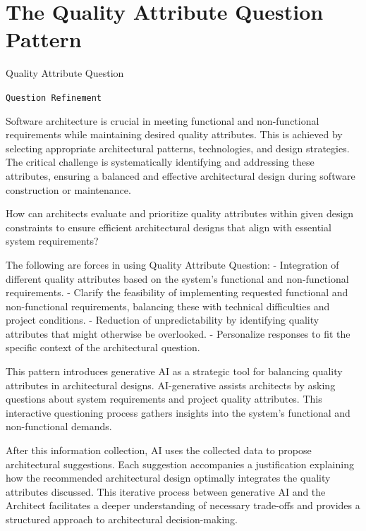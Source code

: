 \section{The Quality Attribute Question Pattern} \label{sec:quality-attribute-question}

 Quality Attribute Question

\texttt{Question Refinement}

 Software architecture is crucial in meeting functional and non-functional requirements while maintaining desired quality attributes. This is achieved by selecting appropriate architectural patterns, technologies, and design strategies. The critical challenge is systematically identifying and addressing these attributes, ensuring a balanced and effective architectural design during software construction or maintenance.

 How can architects evaluate and prioritize quality attributes within given design constraints to ensure efficient architectural designs that align with essential system requirements?

 The following are forces in using Quality Attribute Question:
\newline
- Integration of different quality attributes based on the system’s functional and non-functional requirements.
\newline
- Clarify the feasibility of implementing requested functional and non-functional requirements, balancing these with technical difficulties and project conditions.
\newline
- Reduction of unpredictability by identifying quality attributes that might otherwise be overlooked.
\newline
- Personalize responses to fit the specific context of the architectural question.

 This pattern introduces generative AI as a strategic tool for balancing quality attributes in architectural designs. AI-generative assists architects by asking questions about system requirements and project quality attributes. This interactive questioning process gathers insights into the system's functional and non-functional demands.

After this information collection, AI uses the collected data to propose architectural suggestions. Each suggestion accompanies a justification explaining how the recommended architectural design optimally integrates the quality attributes discussed. This iterative process between generative AI and the Architect facilitates a deeper understanding of necessary trade-offs and provides a structured approach to architectural decision-making.

